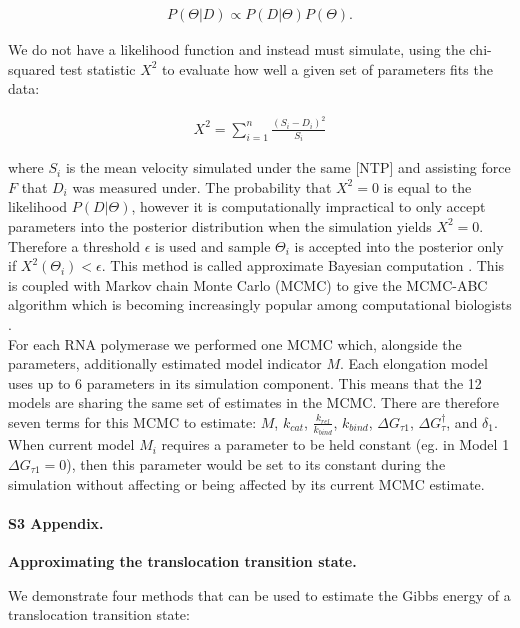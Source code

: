 \documentclass[10pt,letterpaper]{article}
\begin{document}
\begin{eqnarray}
	P(\Theta | D) \propto P(D | \Theta) P(\Theta).
\end{eqnarray}

We do not have a likelihood function and instead must simulate, using the chi-squared test statistic $X^2$ to evaluate how well a given set of parameters fits the data:

\begin{eqnarray}
	X^2 = \sum\limits_{i=1}^n \frac{(S_i - D_i)^2}{S_i}
\end{eqnarray}

where $S_i$ is the mean velocity simulated under the same [NTP] and assisting force $F$ that $D_i$ was measured under. The probability that $X^2=0$ is equal to the likelihood $P(D | \Theta)$, however it is computationally impractical to only accept parameters into the posterior distribution when the simulation yields $X^2=0$. Therefore a threshold $\epsilon$ is used and sample $\Theta_i$ is accepted into the posterior only if $X^2(\Theta_i) < \epsilon$. This method is called approximate Bayesian computation \cite{beaumont2010approximate, csillery2010approximate}. This is coupled with Markov chain Monte Carlo (MCMC) to give the MCMC-ABC algorithm which is becoming increasingly popular among computational biologists \cite{beaumont2010approximate, ratmann2007using}.  \\

For each RNA polymerase we performed one MCMC which, alongside the parameters, additionally estimated model indicator $M$. Each elongation model uses up to 6 parameters in its simulation component. This means that the 12 models are sharing the same set of estimates in the MCMC. There are therefore seven terms for this MCMC to estimate: $M$, $k_{cat}$, $\frac{k_{rel}}{k_{bind}}$, $k_{bind}$, $\Delta G_{\tau 1}$, $\Delta G^\dag_\tau$, and $\delta_1$. When current model $M_i$ requires a parameter to be held constant (eg. in Model 1 $\Delta G_{\tau 1} = 0$), then this parameter would be set to its constant during the simulation without affecting or being affected by its current MCMC estimate. 




\paragraph*{S3 Appendix.}
\label{S3_Appendix} {\bf Approximating the translocation transition state.} 

We demonstrate four methods that can be used to estimate the Gibbs energy of a translocation transition state:
\end{document}
